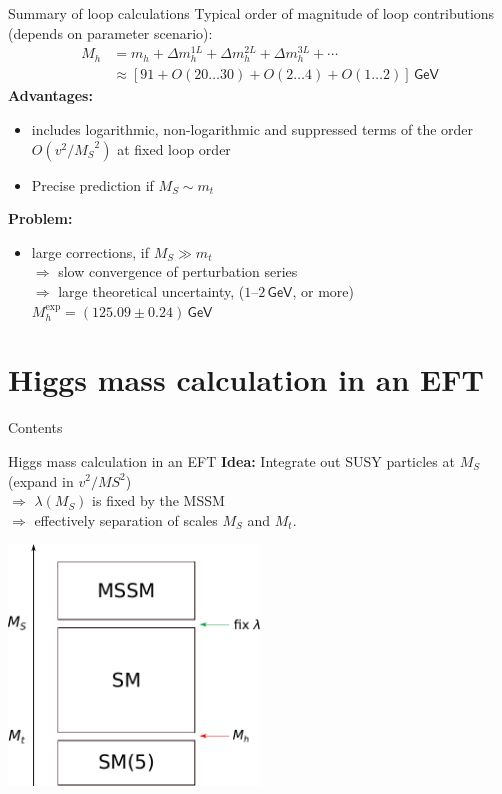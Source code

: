 \documentclass[hyperref={pdfpagelabels=false},ngerman]{beamer}
\newcommand{\eh}[1]{\,\mathsf{#1}}
\newcommand{\MS}{\ensuremath{M_S}}
\renewcommand{\emph}{\textbf}
\begin{document}
\begin{frame}{Summary of loop calculations}
  Typical order of magnitude of loop contributions (depends on
  parameter scenario):
  \begin{align*}
    M_h &= m_h + \Delta m_h^{1L} + \Delta m_h^{2L} + \Delta m_h^{3L} + \cdots \\
    &\approx [91 + O(20\ldots 30) + O(2\ldots 4) + O(1\ldots 2)] \eh{GeV}
  \end{align*}
  \emph{Advantages:}
  \begin{itemize}
  \item includes logarithmic, non-logarithmic and suppressed terms of
    the order $O(v^2/\MS^2)$ at fixed loop order
  \item Precise prediction if $\MS \sim m_t$
  \end{itemize}
  \emph{Problem:}
  \begin{itemize}
  \item large corrections, if $\MS \gg m_t$ \\
    $\Rightarrow$ slow convergence of perturbation series \\
    $\Rightarrow$ large theoretical uncertainty, ($1$--$2\eh{GeV}$, or
    more) \\
    $M_h^{\text{exp}} = (125.09 \pm 0.24)\eh{GeV}$
  \end{itemize}
\end{frame}


\section{Higgs mass calculation in an EFT}

\begin{frame}{Contents}
  \tableofcontents[currentsection]  
\end{frame}

\begin{frame}{Higgs mass calculation in an EFT}
  \emph{Idea:} Integrate out SUSY particles at $\MS$ (expand in $v^2/MS^2$) \\
  $\Rightarrow$ $\lambda(\MS)$ is fixed by the MSSM \\
  $\Rightarrow$ effectively separation of scales $\MS$ and $M_t$.
  \begin{center}
    \includegraphics[width=0.5\textwidth]{images/mssm-sm-tower-eft}
  \end{center}
\end{frame}
\end{document}
